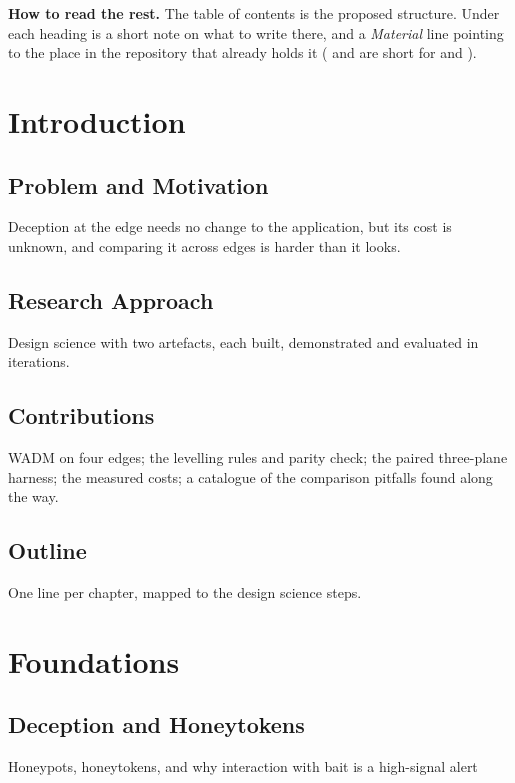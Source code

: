 \documentclass{rptuma}
\begin{document}
\textbf{How to read the rest.} The table of contents is the proposed structure. Under each
heading is a short note on what to write there, and a \emph{Material} line pointing to the
place in the repository that already holds it ( and  are short for
 and ).

\frontmatternote

\tableofcontents
\cleardoublepage
{}

\chapter{Introduction}
\section{Problem and Motivation}
Deception at the edge needs no change to the application, but its cost is unknown, and comparing
it across edges is harder than it looks.

\section{Research Approach}
Design science with two artefacts, each built, demonstrated and evaluated in iterations.

\section{Contributions}
WADM on four edges; the levelling rules and parity check; the paired three-plane harness; the
measured costs; a catalogue of the comparison pitfalls found along the way.

\section{Outline}
One line per chapter, mapped to the design science steps.

\chapter{Foundations}
\section{Deception and Honeytokens}
Honeypots, honeytokens, and why interaction with bait is a high-signal alert
\cite{spitzner2002honeypots,spitzner2003honeytokens}
\end{document}
